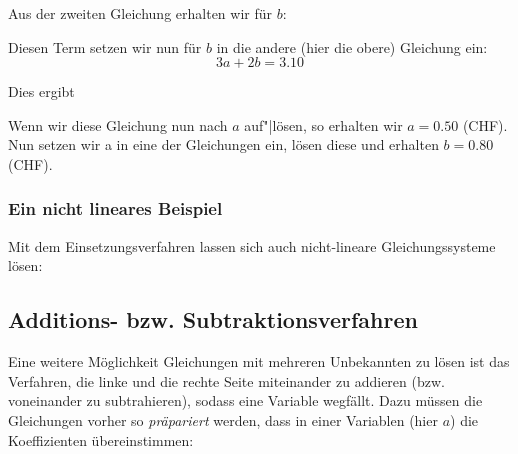
Aus der zweiten Gleichung erhalten wir für $b$:


Diesen Term setzen wir nun für $b$ in die andere (hier die obere) Gleichung ein:
$$3a+2b = 3.10$$

Dies ergibt


Wenn wir diese Gleichung nun nach $a$ auf"|lösen, so erhalten wir $a = 0.50$ (CHF).
Nun setzen wir a in eine der Gleichungen ein, lösen diese und erhalten $b = 0.80$ (CHF).



\subsubsection{Ein nicht lineares Beispiel}
Mit dem Einsetzungsverfahren lassen sich auch nicht-lineare
Gleichungssysteme lösen:


  
\subsection{Additions- bzw. Subtraktionsverfahren}
Eine weitere Möglichkeit Gleichungen mit mehreren Unbekannten zu lösen ist das Verfahren, die linke und die rechte Seite miteinander zu addieren (bzw. voneinander zu subtrahieren), sodass eine Variable wegfällt. Dazu müssen die Gleichungen vorher so \textit{präpariert} werden, dass in einer Variablen (hier \zB $a$) die Koeffizienten übereinstimmen:

